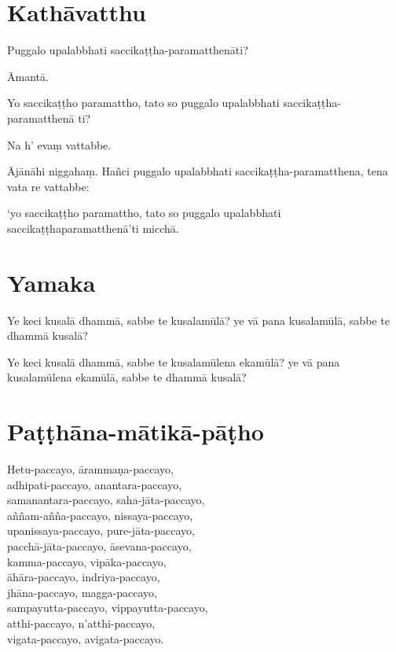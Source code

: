 \section{Kathāvatthu}

Puggalo upalabbhati saccikaṭṭha-paramatthenāti?

Āmantā.

Yo saccikaṭṭho paramattho, tato so puggalo upalabbhati
saccikaṭṭha-paramatthenā ti?

Na h’ evaṃ vattabbe.

Ājānāhi niggahaṃ. Hañci puggalo upalabbhati
saccikaṭṭha-paramatthena, tena vata re vattabbe:

`yo saccikaṭṭho paramattho, tato so puggalo upalabbhati
saccikaṭṭhaparamatthenā'ti micchā.


\section{Yamaka}

Ye keci kusalā dhammā, sabbe te kusalamūlā? ye vā pana kusalamūlā, sabbe te
dhammā kusalā?

Ye keci kusalā dhammā, sabbe te kusalamūlena ekamūlā? ye vā pana kusalamūlena
ekamūlā, sabbe te dhammā kusalā?


\section{Paṭṭhāna-mātikā-pāṭho}


Hetu-paccayo, ārammaṇa-paccayo,\\
adhipati-paccayo, anantara-paccayo,\\
samanantara-paccayo, saha-jāta-paccayo,\\
aññam-añña-paccayo, nissaya-paccayo,\\
upanissaya-paccayo, pure-jāta-paccayo,\\
pacchā-jāta-paccayo, āsevana-paccayo,\\
kamma-paccayo, vipāka-paccayo,\\
āhāra-paccayo, indriya-paccayo,\\
jhāna-paccayo, magga-paccayo,\\
sampayutta-paccayo, vippayutta-paccayo,\\
atthi-paccayo, n'atthi-paccayo,\\
vigata-paccayo, avigata-paccayo.

